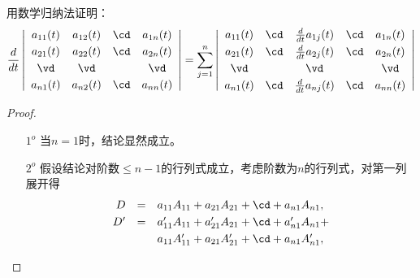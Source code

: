 \begin{frame}
\begin{testexample} 
  用数学归纳法证明：
  $$
  \frac{d}{dt} \left|
    \begin{array}{cccc}
      a_{11}(t)&a_{12}(t)&\cd&a_{1n}(t)\\[0.1cm]
      a_{21}(t)&a_{22}(t)&\cd&a_{2n}(t)\\[0.1cm]
      \vd&\vd&&\vd\\[0.1cm]
      a_{n1}(t)&a_{n2}(t)&\cd&a_{nn}(t)
    \end{array}
  \right| = \sum_{j=1}^n\left|
    \begin{array}{ccccc}
      a_{11}(t)&\cd&\frac{d}{dt} a_{1j}(t)&\cd&a_{1n}(t)\\[0.1cm]
      a_{21}(t)&\cd&\frac{d}{dt} a_{2j}(t)&\cd&a_{2n}(t)\\[0.1cm]
      \vd&&\vd&&\vd\\[0.1cm]
      a_{n1}(t)&\cd&\frac{d}{dt} a_{nj}(t)&\cd&a_{nn}(t)
    \end{array}
  \right|
  $$
\end{testexample}


\begin{proof}
	
\begin{itemize}
\item[$1^o$] 当$n=1$时，结论显然成立。
\item[$2^o$] 假设结论对阶数$\le n-1$的行列式成立，考虑阶数为$n$的行列式，对第一列展开得
$$
\begin{array}{rcl}
D &=& a_{11}A_{11} +  a_{21}A_{21} + \cd + a_{n1}A_{n1}, \\[0.1cm]
D^\prime &=& a_{11}^\prime A_{11} +  a_{21}^\prime A_{21} + \cd + a_{n1}^\prime A_{n1} + \\[0.1cm]
&& a_{11}A_{11}^\prime +  a_{21}A_{21}^\prime + \cd + a_{n1}A_{n1}^\prime,      
\end{array}
$$


\end{itemize}
\end{proof}
\end{frame}
